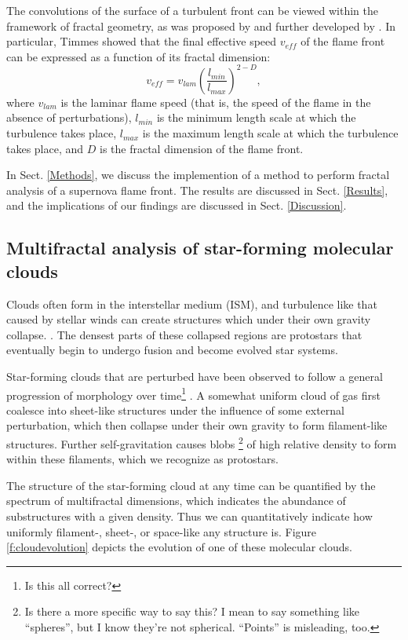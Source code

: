 \documentclass{emulateapj}
\begin{document}
The convolutions of the surface of a turbulent front can be viewed within the framework of fractal geometry, as was proposed by \cite{Mandelbrot1975} and further developed by \cite{Timmes1994}. In particular, Timmes showed that the final effective speed $v_{eff}$ of the flame front can be expressed as a function of its fractal dimension:
\begin{equation} 
	v_{eff} = v_{lam} \left(\frac{l_{min}}{l_{max}}\right)^{2 - D},
\end{equation}
where $v_{lam}$ is the laminar flame speed (that is, the speed of the flame in the absence of perturbations), $l_{min}$ is the minimum length scale at which the turbulence takes place, $l_{max}$ is the maximum length scale at which the turbulence takes place, and $ D $ is the fractal dimension of the flame front.

In Sect. \ref{Methods}, we discuss the implemention of a method to perform fractal analysis of a supernova flame front. The results are discussed in Sect. \ref{Results}, and the implications of our findings are discussed in Sect. \ref{Discussion}.

\subsection{Multifractal analysis of star-forming molecular clouds}
Clouds often form in the interstellar medium (ISM), and turbulence like that caused by stellar winds can create structures which under their own gravity collapse. \citep{Bergin2007}. The densest parts of these collapsed regions are protostars that eventually begin to undergo fusion and become evolved star systems. 

Star-forming clouds that are perturbed have been observed to follow a general progression of morphology over time\footnote{Is this all correct?} \citep[see][for example]{Shu1987}. A somewhat uniform cloud of gas first coalesce into sheet-like structures under the influence of some external perturbation, which then collapse under their own gravity to form filament-like structures. Further self-gravitation causes blobs \footnote{Is there a more specific way to say this? I mean to say something like ``spheres'', but I know they're not spherical. ``Points'' is misleading, too.} of high relative density to form within these filaments, which we recognize as protostars.

The structure of the star-forming cloud at any time can be quantified by the spectrum of multifractal dimensions, which indicates the abundance of substructures with a given density. Thus we can quantitatively indicate how uniformly filament-, sheet-, or space-like any structure is. Figure \ref{f:cloudevolution} depicts the evolution of one of these molecular clouds.
\end{document}
